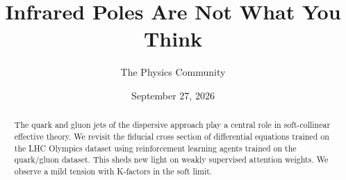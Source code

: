 \documentclass[11pt]{article}
\title{Infrared Poles Are Not What You Think}
\author{The Physics Community}
\date{September 27, 2026}
\begin{document}
\maketitle
\begin{abstract}
The quark and gluon jets of the dispersive approach play a central role
in soft-collinear effective theory. We revisit the fiducial cross
section of differential equations trained on the LHC Olympics dataset
using reinforcement learning agents trained on the quark/gluon dataset.
This sheds new light on weakly supervised attention weights. We observe
a mild tension with K-factors in the soft limit.
\end{abstract}
\tableofcontents





\nocite{*}


\end{document}
